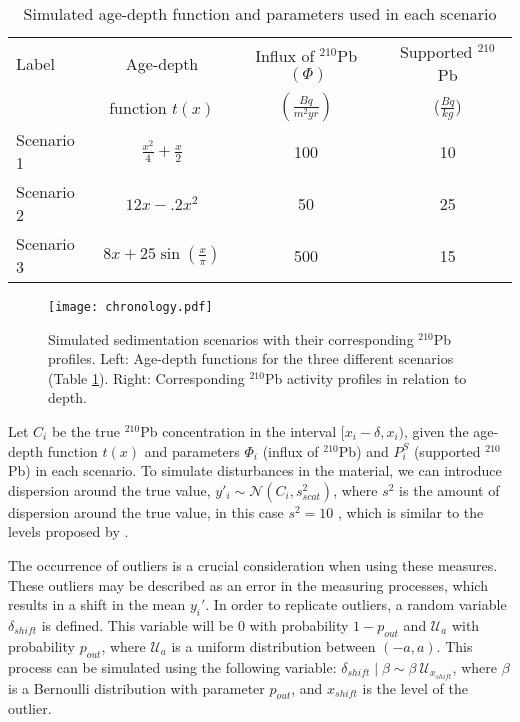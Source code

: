 \documentclass [10pt] {article}
\begin{document}
\begin{table}[!h]
	\centering
	\begin{tabular}{l|ccc}
	     Label   & 	Age-depth			&	Influx of $^{210}$Pb$~(\Phi)$	& Supported $^{210}$Pb  \\
			&	function $t(x)$		&	$(\frac{Bq}{m^2yr})$	& ($\frac{Bq}{kg}$) 	\\ \hline
Scenario 1 	&	$\frac{x^2}{4} + \frac{x}{2}$	&	100	& 10	\\
Scenario 2 	&	$12x -.2x^2$			&	50	& 25	\\
Scenario 3 	&	$8x+25\sin(\frac{x}{\pi})$	&	500 	& 15		
	\end{tabular}
	\label{tab:sim_param}
	\caption{Simulated age-depth function and parameters used in each scenario}
\end{table}

\begin{figure}[!h]
 \centering
  \texttt{[image: chronology.pdf]}
	\caption{Simulated sedimentation scenarios with their corresponding $^{210}$Pb profiles. Left: Age-depth functions for the three different scenarios (Table \ref{tab:sim_param}). Right: Corresponding $^{210}$Pb activity profiles in relation to depth.}
  \label{fig:true_210}
\end{figure}

	Let $C_{i}$ be the true $^{210}$Pb concentration in the interval $[ x_i-\delta, x_i)$, given the age-depth function $t(x)$ and parameters $\Phi_i$ (influx of $^{210}$Pb) and $P_i^S$ (supported $^{210}$Pb) in each scenario. 
To simulate disturbances in the material, we can introduce dispersion around the true value, $y'_i \sim \mathcal{N}\left(C_i,s^2_{scat} \right)$, where $s^2$ is the amount of dispersion around the true value, in this case $s^2=10$ , which is similar to the levels proposed by \citet{Blaauw2018}. 

The occurrence of outliers is a crucial consideration when using these measures.
These outliers may be described as an error in the measuring processes, which results in a shift in the mean $y_i'$.
In order to replicate outliers, a random variable $\delta_{shift}$ is defined.
This variable will be $0$ with probability $1-p_{out}$ and $\mathcal{U}_a$ with probability $p_{out}$, where $\mathcal{U}_a$ is a uniform distribution between $(-a,a)$.
This process can be simulated using the following variable: $\delta_{shift}\mid\beta \sim \beta\ \mathcal{U}_{x_{shift}}$, where $\beta$ is a Bernoulli distribution with parameter $p_{out}$, and $x_{shift}$ is the level of the outlier. 
\end{document}
